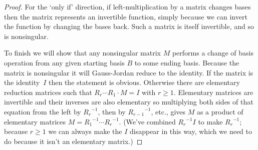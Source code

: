 \begin{proof}
For the `only if' direction, 
if left-multiplication by a matrix changes bases then
the matrix represents an invertible function,
simply because we can invert the function by changing the bases back.
Such a matrix is itself invertible, and so is nonsingular.

To finish we will show that any nonsingular matrix $M$ 
performs a change of basis operation from any given starting basis $B$ 
to some ending basis.
Because the matrix is nonsingular it will Gauss-Jordan reduce to the
identity.
If the matrix is the identity~$I$ then the statement is obvious.
Otherwise there are elementary reduction matrices such that
$R_r\cdots R_1\cdot M=I$ with $r\geq 1$.
Elementary matrices are invertible and their inverses are also elementary
so multiplying both sides of that equation from the left 
by ${R_r}^{-1}$, then by ${R_{r-1}}^{-1}$, etc., gives 
$M$ as a product of elementary matrices
$M={R_1}^{-1}\cdots {R_r}^{-1}$.
(We've combined ${R_r}^{-1}I$ to make ${R_r}^{-1}$; 
because $r\geq 1$ we can always make the $I$ disappear in this way,
which we need to do because it isn't an elementary matrix.)


\end{proof}

